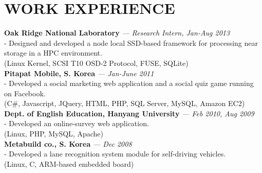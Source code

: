 \section{WORK EXPERIENCE} 
\vspace{0.07in} 
{\bf Oak Ridge National Laboratory}
{\it \footnotesize --- Research Intern, Jan-Aug 2013}\\
  - Designed and developed a node local SSD-based framework for processing near
  storage in a HPC environment.\\
  {\footnotesize(Linux Kernel, SCSI T10 OSD-2 Protocol, FUSE, SQLite)}
\vspace{0.02in}\\
{\bf Pitapat Mobile, S. Korea}
{\it \footnotesize --- Jan-June 2011}\\
  - Developed a social marketing web application and a social quiz game running on
  Facebook.\\
  {\footnotesize(C\#, Javascript, JQuery, HTML, PHP, SQL Server, MySQL, Amazon
  EC2)}
\vspace{0.02in}\\
{\bf Dept. of English Education, Hanyang University}
{\it \footnotesize --- Feb 2010, Aug 2009}\\
  - Developed an online-survey web application.\\
  {\footnotesize(Linux, PHP, MySQL, Apache)}
\vspace{0.02in}\\
{\bf Metabuild co., S. Korea}
{\it \footnotesize --- Dec 2008}\\
  - Developed a lane recognition system module for self-driving vehicles.\\
  {\footnotesize(Linux, C, ARM-based embedded board)}

